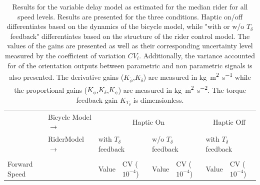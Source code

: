 \begin{table}[]
    \caption{ Results for the variable delay model as estimated for the median rider for all speed levels. Results are presented for the three conditions. Haptic on/off differentiates based on the dynamics of the bicycle model, while "with or w/o \ensuremath{T_\delta} feedback" differentiates based on the structure of the rider control model. The values of the gains are presented as well as their corresponding uncertainty level measured by the coefficient of variation \ensuremath{CV_i}. Additionally, the variance accounted for of the orientation outputs between parametric and non parametric signals is also presented. The derivative gains (\ensuremath{K_{\dot{\phi}}},\ensuremath{K_{\dot{\delta}}}) are measured in \si{\kilogram\square\meter\per\second} while the proportional gains (\ensuremath{K_{\phi}},\ensuremath{K_{\delta}},\ensuremath{K_{\psi}}) are measured in \si{\kilogram\square\meter\per\square\second}. The torque feedback gain \ensuremath{K_{T_\delta}} is dimensionless.}
    \label{tb:variable}
    \begin{tabular}{llcccccc}
    \hline
                                                   & Bicycle Model\;$\rightarrow$                                  & \multicolumn{4}{c}{Haptic On}                                                                                                                                                                           & \multicolumn{2}{c}{Haptic Off}                                                                     \\ \cline{2-8} 
                                                   & {\color[HTML]{333333} Rider\;\;\;\;Model\;$\rightarrow$} & \multicolumn{2}{l}{with $T_\delta$ feedback}                                                       & \multicolumn{2}{l}{w/o  $T_\delta$ feedback}                                                       & \multicolumn{2}{l}{with $T_\delta$ feedback}                                                       \\ \cline{2-8} 
                                                   &                                                        & \multicolumn{1}{l}{}                        & \multicolumn{1}{l}{}                                 & \multicolumn{1}{l}{}                        & \multicolumn{1}{l}{}                                 & \multicolumn{1}{l}{}                        & \multicolumn{1}{l}{}                                 \\
    \multirow{-2}{*}{Forward Speed}                &                                                        & \multicolumn{1}{l}{\multirow{-2}{*}{Value}} & \multicolumn{1}{l}{\multirow{-2}{*}{CV ($10^{-4}$)}} & \multicolumn{1}{l}{\multirow{-2}{*}{Value}} & \multicolumn{1}{l}{\multirow{-2}{*}{CV ($10^{-4}$)}} & \multicolumn{1}{l}{\multirow{-2}{*}{Value}} & \multicolumn{1}{l}{\multirow{-2}{*}{CV ($10^{-4}$)}} \\ \hline

\end{tabular}
\end{table}
